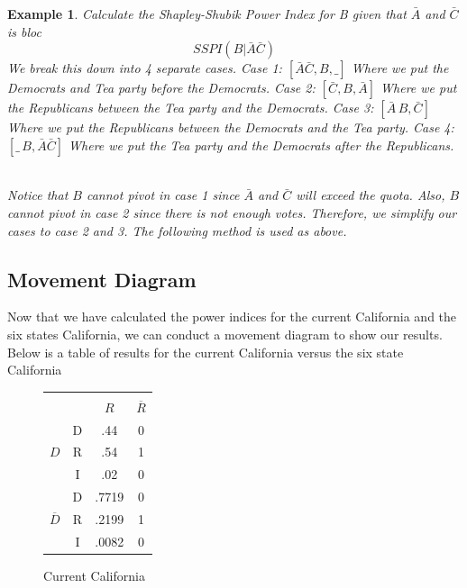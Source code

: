 \documentclass[12pt]{article}
\newtheorem{example}[theorem]{Example}
\begin{document}
\begin{example}
Calculate the Shapley-Shubik Power Index for B given that $\bar{A}$ and $\bar{C}$ is bloc
\begin{equation}
SSPI(B|\bar{A}\bar{C})
\end{equation}
We break this down into 4 separate cases. 
Case 1: $[\bar{A}\bar{C},B,\_]$
Where we put the Democrats and Tea party before the Democrats.
Case 2: $[\bar{C},B,\bar{A}]$
Where we put the Republicans between the Tea party and the Democrats. 
Case 3: $[\bar{A} \, B,\bar{C}]$
Where we put the Republicans between the Democrats and the Tea party.
Case 4: $[\_ \,B,\bar{A}\bar{C}]$
Where we put the Tea party and the Democrats after the Republicans.
\\
\\
\par Notice that $B$ cannot pivot in case 1 since $\bar{A}$ and $\bar{C}$ will exceed the quota. Also, $B$ cannot pivot in case 2 since there is not enough votes. Therefore, we simplify our cases to case 2 and 3. The following method is used as above. 
\end{example}

\subsection{Movement Diagram}
Now that we have calculated the power indices for the current California and the six states California, we can conduct a movement diagram to show our results. Below is a table of results for the current California versus the six state California

\begin{figure}
\begin{center}
\begin{tabular}{| c | c | c | c |} \hline
         &  &     &           \\
         &  & $R$ & $\overline{R}$ \\ \hline
                &D &.44 &  0     \\
$D$           &R &.54 &  1     \\
                &I &.02  & 0      \\ \hline
                &D &.7719 &  0    \\
$\overline{D}$&R &.2199 &  1     \\
                &I &.0082 & 0     \\ \hline
\end{tabular}
    \caption{Current California \label{overflow}}
\end{center}
\end{figure}
\end{document}
